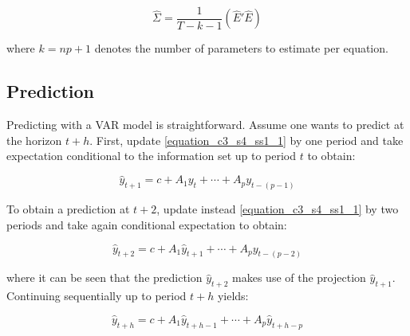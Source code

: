 \begin{equation}
\hat{\Sigma} = \frac{1}{T - k - 1}(\hat{E}'\hat{E})
\label{equation_c3_s4_ss2_2}
\end{equation}

where $k = np + 1$ denotes the number of parameters to estimate per equation. 


\subsection{Prediction}
\label{chapter3_section4_subsection3}


Predicting with a VAR model is straightforward. Assume one wants to predict at the horizon $t+h$. First, update \ref{equation_c3_s4_ss1_1} by one period and take expectation conditional to the information set up to period $t$ to obtain:

\begin{equation}
\hat{y}_{t+1} = c + A_1 y_{t} + \cdots + A_p y_{t-(p-1)}
\label{equation_c3_s4_ss3_1}
\end{equation}

To obtain a prediction at $t+2$, update instead \ref{equation_c3_s4_ss1_1} by two periods and take again conditional expectation to obtain:

\begin{equation}
\hat{y}_{t+2} = c + A_1 \hat{y}_{t+1} + \cdots + A_p y_{t-(p-2)}
\label{equation_c3_s4_ss3_2}
\end{equation}

where it can be seen that the prediction $\hat{y}_{t+2}$ makes use of the projection $\hat{y}_{t+1}$. Continuing sequentially up to period $t+h$ yields:

\begin{equation}
\hat{y}_{t+h} = c + A_1 \hat{y}_{t+h-1} + \cdots + A_p \hat{y}_{t+h-p}
\label{equation_c3_s4_ss3_3}
\end{equation}

\newpage









































